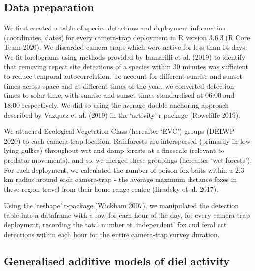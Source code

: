 \documentclass[]{elsarticle} %
\begin{document}
\hypertarget{data-preparation}{%
\subsection{Data preparation}\label{data-preparation}}

We first created a table of species detections and deployment information (coordinates, dates) for every camera-trap deployment in R version 3.6.3 (R Core Team 2020). We discarded camera-traps which were active for less than 14 days. We fit lorelograms using methods provided by Iannarilli et al. (2019) to identify that removing repeat site detections of a species within 30 minutes was sufficient to reduce temporal autocorrelation. To account for different sunrise and sunset times across space and at different times of the year, we converted detection times to solar time; with sunrise and sunset times standardised at 06:00 and 18:00 respectively. We did so using the average double anchoring approach described by Vazquez et al. (2019) in the `activity' r-package (Rowcliffe 2019).

We attached Ecological Vegetation Class (hereafter `EVC') groups (DELWP 2020) to each camera-trap location. Rainforests are interspersed (primarily in low lying gullies) throughout wet and damp forests at a finescale (relevant to predator movements), and so, we merged these groupings (hereafter `wet forests'). For each deployment, we calculated the number of poison fox-baits within a 2.3 km radius around each camera-trap - the average maximum distance foxes in these region travel from their home range centre (Hradsky et al. 2017).

Using the `reshape' r-package (Wickham 2007), we manipulated the detection table into a dataframe with a row for each hour of the day, for every camera-trap deployment, recording the total number of `independent' fox and feral cat detections within each hour for the entire camera-trap survey duration.

\hypertarget{generalised-additive-models-of-diel-activity}{%
\subsection{Generalised additive models of diel activity}\label{generalised-additive-models-of-diel-activity}}
\end{document}
